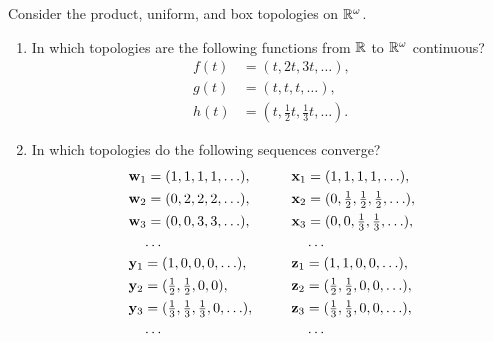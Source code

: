\begin{exercise}[ID=2.20.4]
    Consider the product, uniform, and box topologies on $\mathbb{R}^\omega$.
    \begin{enumerate}[label={(\alph*)}, align=left, leftmargin=\parindent, listparindent=\parindent, labelwidth=0pt, itemindent=!]
        \item In which topologies are the following functions from $\mathbb{R}$ to $\mathbb{R}^\omega$ continuous?
        \begin{align*}
            f(t) &= (t, 2t, 3t, \ldots), \\
            g(t) &= (t, t, t, \ldots), \\
            h(t) &= (t, \tfrac{1}{2} t, \tfrac{1}{3} t, \ldots).
        \end{align*}
        \item In which topologies do the following sequences converge?
        \begin{alignat*}{2}
            & \mathbf{w}_1 = (1, 1, 1, 1, \ldots),\qquad   & & \mathbf{x}_1 = (1, 1, 1, 1, \ldots), \\
            & \mathbf{w}_2 = (0, 2, 2, 2, \ldots),\qquad   & & \mathbf{x}_2 = (0, \tfrac{1}{2}, \tfrac{1}{2}, \tfrac{1}{2}, \ldots), \\
            & \mathbf{w}_3 = (0, 0, 3, 3, \ldots),\qquad   & & \mathbf{x}_3 = (0, 0, \tfrac{1}{3}, \tfrac{1}{3}, \ldots), \\
            & \quad\ldots                           & & \quad\ldots \\
            & \mathbf{y}_1 = (1, 0, 0, 0, \ldots),\qquad   & & \mathbf{z}_1 = (1, 1, 0, 0, \ldots), \\
            & \mathbf{y}_2 = (\tfrac{1}{2}, \tfrac{1}{2}, 0, 0),                       & & \mathbf{z}_2 = (\tfrac{1}{2}, \tfrac{1}{2}, 0, 0, \ldots), \\
            & \mathbf{y}_3 = (\tfrac{1}{3}, \tfrac{1}{3}, \tfrac{1}{3}, 0, \ldots),    & & \mathbf{z}_3 = (\tfrac{1}{3}, \tfrac{1}{3}, 0, 0, \ldots), \\
            & \quad\ldots                                                       & & \quad\ldots
        \end{alignat*}
    \end{enumerate}
\end{exercise}

